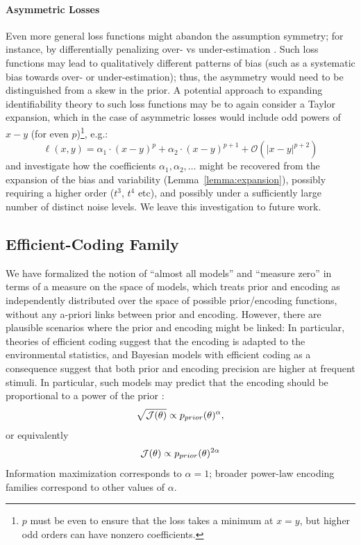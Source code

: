 \documentclass[si.tex]{subfiles}
\begin{document}
\paragraph*{Asymmetric Losses}
Even more general loss functions might abandon the assumption symmetry; for instance, by differentially penalizing over- vs under-estimation \citep[e.g.][]{Mamassian2008OverconfidenceIA,Hudson2008OptimalCF}.
Such loss functions may lead to qualitatively different patterns of bias (such as a systematic bias towards over- or under-estimation); thus, the asymmetry would need to be distinguished from a skew in the prior. 
A potential approach to expanding identifiability theory to such loss functions may be to again consider a Taylor expansion, which in the case of asymmetric losses would include odd powers of $x-y$ (for even $p$)\footnote{$p$ must be even to ensure that the loss takes a minimum at $x=y$, but higher odd orders can have nonzero coefficients.}, e.g.:
\begin{equation}
\ell(x,y) = \alpha_1 \cdot (x-y)^p + \alpha_2 \cdot (x-y)^{p+1} + \mathcal{O}(|x-y|^{p+2})
\end{equation}
and investigate how the coefficients $\alpha_1, \alpha_2, \dots$ might be recovered from the expansion of the bias and variability (Lemma~\ref{lemma:expansion}), possibly requiring a higher order ($t^3$, $t^4$ etc), and possibly under a sufficiently large number of distinct noise levels.
We leave this investigation to future work.

\clearpage
\newpage

\subsection{Efficient-Coding Family}\label{sec:simulations-efficient-coding}

We have formalized the notion of ``almost all models'' and ``measure zero'' in terms of a measure on the space of models, which treats prior and encoding as independently distributed over the space of possible prior/encoding functions, without any a-priori links between prior and encoding.
However, there are plausible scenarios where the prior and encoding might be linked:
In particular, theories of efficient coding suggest that the encoding is adapted to the environmental statistics, and Bayesian models with efficient coding as a consequence suggest that both prior and encoding precision are higher at frequent stimuli.
In particular, such models may predict that the encoding  should be proportional to a power of the prior \citep[e.g.][]{Wei2015ABO, Morais2018PowerlawEN}:
\begin{equation}
\sqrt{\mathcal{J}(\theta)} \propto p_{prior}(\theta)^\alpha,
\end{equation}
or equivalently
\begin{equation}
\mathcal{J}(\theta) \propto p_{prior}(\theta)^{2\alpha}
\end{equation}
Information maximization \citep{Wei2015ABO} corresponds to \(\alpha=1\); broader power-law encoding families \citep[e.g.][]{Morais2018PowerlawEN} correspond to other values of \(\alpha\).
\end{document}
